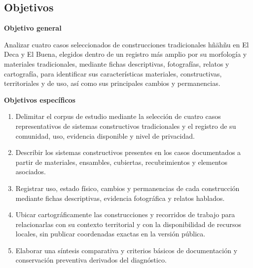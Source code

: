 \subsection{Objetivos}

\textbf{Objetivo general}

Analizar cuatro casos seleccionados de construcciones tradicionales hñähñu en El Deca y El Buena, elegidos dentro de un registro más amplio por su morfología y materiales tradicionales, mediante fichas descriptivas, fotografías, relatos y cartografía, para identificar sus características materiales, constructivas, territoriales y de uso, así como sus principales cambios y permanencias.

\vspace{1em}
\textbf{Objetivos específicos}
\begin{enumerate}
	\item{Delimitar el corpus de estudio mediante la selección de cuatro casos representativos de sistemas constructivos tradicionales y el registro de su comunidad, uso, evidencia disponible y nivel de privacidad.}

	\item{Describir los sistemas constructivos presentes en los casos documentados a partir de materiales, ensambles, cubiertas, recubrimientos y elementos asociados.}

	\item{Registrar uso, estado físico, cambios y permanencias de cada construcción mediante fichas descriptivas, evidencia fotográfica y relatos hablados.}

	\item{Ubicar cartográficamente las construcciones y recorridos de trabajo para relacionarlas con su contexto territorial y con la disponibilidad de recursos locales, sin publicar coordenadas exactas en la versión pública.}

	\item{Elaborar una síntesis comparativa y criterios básicos de documentación y conservación preventiva derivados del diagnóstico.}
\end{enumerate}
